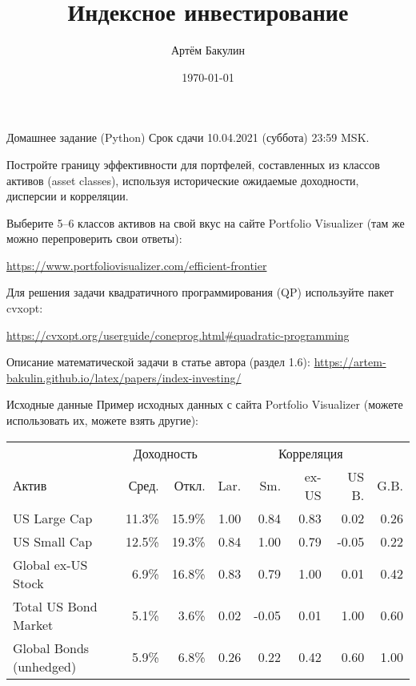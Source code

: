 \documentclass{beamer}
\title{Индексное инвестирование}
\author{Артём Бакулин}
\date{\today}
\begin{document}
\begin{frame}{Домашнее задание (Python)}
\justify
Срок сдачи 10.04.2021 (суббота) 23:59 MSK.

\justify
Постройте границу эффективности для портфелей, составленных из классов активов (asset classes), используя исторические ожидаемые доходности, дисперсии и корреляции.

\justify
Выберите 5--6 классов активов на свой вкус на сайте Portfolio Visualizer (там же можно перепроверить свои ответы):

{\scriptsize \url{https://www.portfoliovisualizer.com/efficient-frontier}}

\justify
Для решения задачи квадратичного программирования (QP) используйте пакет cvxopt:

{\scriptsize \url{https://cvxopt.org/userguide/coneprog.html\#quadratic-programming}}

\justify
Описание математической задачи в статье автора (раздел 1.6):
{\scriptsize \url{https://artem-bakulin.github.io/latex/papers/index-investing/}}
\end{frame}



\begin{frame}{Исходные данные}
\justify
Пример исходных данных с сайта Portfolio Visualizer (можете использовать их, можете взять другие):

\centering
\vspace{\baselineskip}
\scriptsize
\begin{tabular}{l|r|r|r|r|r|r|r}

 & \multicolumn{2}{c|}{Доходность} & \multicolumn{5}{c}{Корреляция} \\ 
\cline{2-8}
Актив                   & Сред.  & Откл.  & Lar.  & Sm.   & ex-US   & US B.    & G.B. \\ \hline
US Large Cap            & 11.3\% & 15.9\% & 1.00  & 0.84  & 0.83    & 0.02  & 0.26\\
US Small Cap            & 12.5\% & 19.3\% & 0.84  & 1.00  & 0.79    & -0.05 & 0.22\\
Global ex-US Stock      & 6.9\%  & 16.8\% & 0.83  & 0.79  & 1.00    & 0.01 & 0.42\\
Total US Bond Market       & 5.1\%  & 3.6\%  & 0.02  & -0.05 & 0.01    & 1.00 & 0.60\\
Global Bonds (unhedged) & 5.9\%  & 6.8\%  & 0.26  & 0.22  & 0.42    & 0.60 & 1.00
\end{tabular}
\end{frame}
\end{document}
